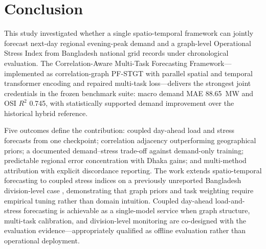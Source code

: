 \section{Conclusion}\label{sec:conclusion}

This study investigated whether a single spatio-temporal framework can jointly forecast next-day regional evening-peak demand and a graph-level Operational Stress Index from Bangladesh national grid records under chronological evaluation. The Correlation-Aware Multi-Task Forecasting Framework---implemented as correlation-graph PF-STGT with parallel spatial and temporal transformer encoding and repaired multi-task loss---delivers the strongest joint credentials in the frozen benchmark suite: macro demand MAE 88.65~MW and OSI $R^2$ 0.745, with statistically supported demand improvement over the historical hybrid reference.

Five outcomes define the contribution: coupled day-ahead load and stress forecasts from one checkpoint; correlation adjacency outperforming geographical priors; a documented demand--stress trade-off against demand-only training; predictable regional error concentration with Dhaka gains; and multi-method attribution with explicit discordance reporting. The work extends spatio-temporal forecasting to coupled stress indices on a previously unreported Bangladesh division-level case \cite{Hossain2025BangladeshSmartGrid}, demonstrating that graph priors and task weighting require empirical tuning rather than domain intuition. Coupled day-ahead load-and-stress forecasting is achievable as a single-model service when graph structure, multi-task calibration, and division-level monitoring are co-designed with the evaluation evidence---appropriately qualified as offline evaluation rather than operational deployment.

